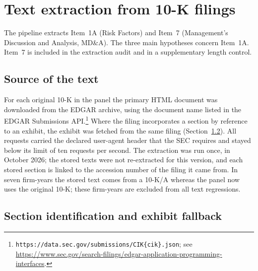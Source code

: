 \section{Text extraction from 10-K filings}
\label{sec:text_extraction}

The pipeline extracts Item~1A (Risk Factors) and Item~7 (Management's Discussion and Analysis, MD\&A). The three main hypotheses concern Item~1A. Item~7 is included in the extraction audit and in a supplementary length control.

\subsection{Source of the text}
\label{ssec:text_source}

For each original 10-K in the panel the primary HTML document was downloaded
from the EDGAR archive, using the document name listed in the EDGAR
Submissions API.\footnote{%
\texttt{https://data.sec.gov/submissions/CIK\{cik\}.json}; see
\url{https://www.sec.gov/search-filings/edgar-application-programming-interfaces}.}
Where the filing incorporates a section by reference to an exhibit, the
exhibit was fetched from the same filing (Section~\ref{ssec:section_id}).
All requests carried the declared user-agent header that the SEC requires
and stayed below its limit of ten requests per second. The extraction was
run once, in October 2026; the stored texts were not re-extracted for this
version, and each stored section is linked to the accession number of the
filing it came from. In seven firm-years the stored text comes from a 10-K/A
whereas the panel now uses the original 10-K; these firm-years are excluded
from all text regressions.

\subsection{Section identification and exhibit fallback}
\label{ssec:section_id}

